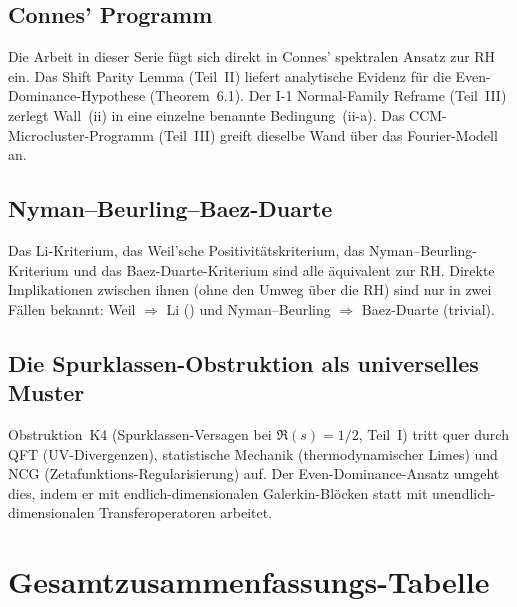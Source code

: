\documentclass[12pt,a4paper]{article}
\theoremstyle{definition}
\theoremstyle{remark}
\begin{document}
\subsection{Connes' Programm}

Die Arbeit in dieser Serie fügt sich direkt in Connes' spektralen Ansatz
zur RH~\cite{Connes2026} ein. Das Shift Parity Lemma (Teil~II) liefert
analytische Evidenz für die Even-Dominance-Hypothese (Theorem~6.1). Der
I-1 Normal-Family Reframe (Teil~III) zerlegt Wall~(ii) in eine einzelne
benannte Bedingung~(ii-a). Das CCM-Microcluster-Programm (Teil~III)
greift dieselbe Wand über das Fourier-Modell an.

\subsection{Nyman--Beurling--Baez-Duarte}

Das Li-Kriterium, das Weil'sche Positivitätskriterium, das
Nyman--Beurling-Kriterium und das Baez-Duarte-Kriterium sind alle
äquivalent zur RH. Direkte Implikationen zwischen ihnen (ohne den Umweg
über die RH) sind nur in zwei Fällen bekannt: Weil $\Rightarrow$ Li
(\cite{BombieriLagarias1999}) und Nyman--Beurling $\Rightarrow$
Baez-Duarte (trivial).

\subsection{Die Spurklassen-Obstruktion als universelles Muster}

Obstruktion~K4 (Spurklassen-Versagen bei $\Re(s) = 1/2$, Teil~I) tritt
quer durch QFT (UV-Divergenzen), statistische Mechanik (thermodynamischer
Limes) und NCG (Zetafunktions-Regularisierung) auf. Der
Even-Dominance-Ansatz umgeht dies, indem er mit endlich-dimensionalen
Galerkin-Blöcken statt mit unendlich-dimensionalen Transferoperatoren
arbeitet.


\section{Gesamtzusammenfassungs-Tabelle}
\label{sec:full-summary}
\end{document}
